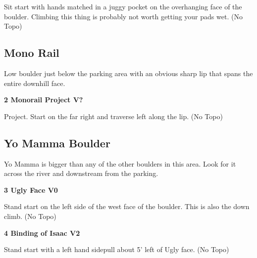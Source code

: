 \begin{multicols}{2}
\begin{adjustwidth}{0.5cm}{}			
Sit start with hands matched in a juggy pocket on the overhanging face of the boulder. Climbing this thing is probably not worth getting your pads wet. (No Topo)
\end{adjustwidth}




\needspace{1.5cm}
\subsection*{Mono Rail}\label{bf:Mono Rail}
Low boulder just below the parking area with an obvious sharp lip that spans the entire downhill face.\\
	


\needspace{1.5cm}
\label{rt:Monorail Project}
\colorbox{black!20}{
\parbox{0.95\linewidth}{
\textbf{
2 Monorail Project V?  
}}}

\begin{adjustwidth}{0.5cm}{}			
Project. Start on the far right and traverse left along the lip. (No Topo)
\end{adjustwidth}




\needspace{1.5cm}
\subsection*{Yo Mamma Boulder}\label{bf:Yo Mamma Boulder}
Yo Mamma is bigger than any of the other boulders in this area. Look for it across the river and downstream from the parking.\\
	


\needspace{1.5cm}
\label{rt:Ugly Face}
\colorbox{green!20}{
\parbox{0.95\linewidth}{
\textbf{
3 Ugly Face V0  \warn
}}}

\begin{adjustwidth}{0.5cm}{}			
Stand start on the left side of the west face of the boulder. This is also the down climb. (No Topo)
\end{adjustwidth}



\needspace{1.5cm}
\label{rt:Binding of Isaac}
\colorbox{green!20}{
\parbox{0.95\linewidth}{
\textbf{
4 Binding of Isaac V2  \warn
}}}

\begin{adjustwidth}{0.5cm}{}			
Stand start with a left hand sidepull about 5' left of Ugly face. (No Topo)
\end{adjustwidth}





\end{multicols}
